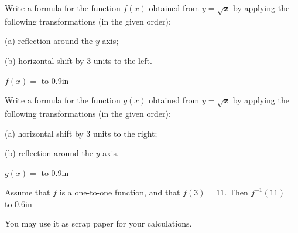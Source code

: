 \documentclass[11pt,answers]{exam}
\begin{document}
\begin{questions}
\begin{parts}
\end{parts}

\question[1] Write a formula for the function $f(x)$ obtained from $\displaystyle y=\sqrt{x}$ by applying the following transformations (in the given order): 
\begin{enumerate*}[series=MyList, before=\hspace{-0.6ex}] 
\item[(a)] reflection around the $y$ axis; \item[(b)] horizontal shift by 3 units to the left.
\end{enumerate*}

$f(x) =$ \hbox to 0.9in{\dotfill} 

\question[1] Write a formula for the function $g(x)$ obtained from $\displaystyle y=\sqrt{x}$ by applying the following transformations (in the given order): 
\begin{enumerate*}[series=MyList, before=\hspace{-0.6ex}] 
\item[(a)] horizontal shift by 3 units to the right;
\item[(b)] reflection around the $y$ axis.
\end{enumerate*}

$g(x) =$ \hbox to 0.9in{\dotfill} 

\bonusquestion[1] Assume that $f$ is a one-to-one function, and that $f(3)=11$. Then $\displaystyle f^{-1}(11)=$\hbox to 0.6in{\dotfill} 

\end{questions}
\newpage
\thispagestyle{empty}


\setlength\fboxrule{2pt}\setlength\fboxsep{2mm}
 You may use it as scrap paper for your calculations.
\end{document}
